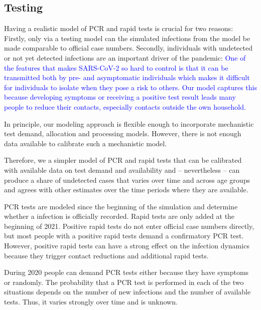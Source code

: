 \subsection{Testing} %
\label{sub:testing}


Having a realistic model of PCR and rapid tests is crucial for two reasons: Firstly, only
via a testing model can the simulated infections from the model be made comparable to
official case numbers. Secondly, individuals with undetected or not yet detected
infections are an important driver of the pandemic: \textcolor{blue}{One of the features
that makes SARS-CoV-2 so hard to control is that it can be transmitted both by pre- and
asymptomatic individuals which makes it difficult for individuals to isolate when they
pose a risk to others. Our model captures this because developing symptoms or receiving a
positive test result leads many people to reduce their contacts, especially contacts
outside the own household.}


In principle, our modeling approach is flexible enough to incorporate mechanistic test
demand, allocation and processing models. However, there is not enough data available to
calibrate such a mechanistic model.

Therefore, we  a simpler model of PCR and rapid tests that
can be calibrated with available data on test demand and availability and -- nevertheless
-- can produce a share of undetected cases that varies over time and across age groups
and agrees with other estimates over the time periods where they are available.

PCR tests are modeled since the beginning of the simulation and determine whether a
infection is officially recorded. Rapid tests are only added at the beginning of 2021.
Positive rapid tests do not enter official case numbers directly, but most people with a
positive rapid tests demand a confirmatory PCR test. However, positive rapid tests can
have a strong effect on the infection dynamics because they trigger contact reductions
and additional rapid tests.

During 2020 people can demand PCR tests either because they have symptoms or randomly.
The probability that a PCR test is performed in each of the two situations depends on the
number of new infections and the number of available tests. Thus, it varies strongly over
time and is unknown.

